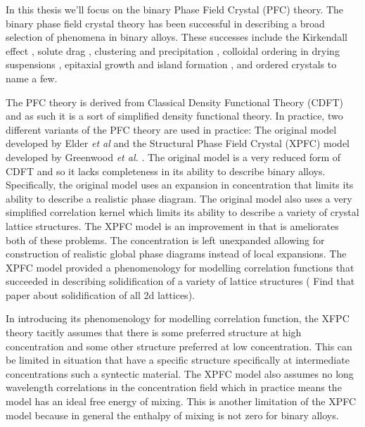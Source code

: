 In this thesis we'll focus on the binary Phase Field Crystal (PFC) theory. The 
binary phase field crystal theory has been successful in describing a broad
selection of phenomena in binary alloys. These successes include the Kirkendall
effect \cite{ELDER11_KIRKENDALL, LU15}, solute drag \cite{GREENWOOD12}, 
clustering and precipitation \cite{FALLAH12, FALLAH13, FALLAH13_AlCu_experiment},
colloidal ordering in drying suspensions \cite{GANAI13}, epitaxial growth
and island formation \cite{ELDER10_NANOISLAND, LU16}, and ordered crystals
\cite{ALSTER17} to name a few. 

The PFC theory is derived from Classical Density Functional Theory (CDFT) and as
such it is a sort of simplified density functional theory. In practice,
two different variants of the PFC theory are used in practice: The original
model developed by Elder \textit{et al} \cite{ELDER07} and the Structural
Phase Field Crystal (XPFC) model developed by Greenwood \textit{et al.}
\cite{GREENWOOD11_BINARY}. The original model is a very reduced form of
CDFT and so it lacks completeness in its ability to describe binary alloys.
Specifically, the original model uses an expansion in concentration that limits 
its ability to describe a realistic phase diagram. The original model also
uses a very simplified correlation kernel which limits its ability to describe
a variety of crystal lattice structures. The XPFC model is an improvement 
in that is ameliorates both of these problems. The concentration is left 
unexpanded allowing for construction of realistic global phase diagrams instead
of local expansions. The XPFC model provided a phenomenology for modelling
correlation functions that succeeded in describing solidification of a
variety of lattice structures ({\color{ForestGreen} Find that paper about
solidification of all 2d lattices}). 


In introducing its phenomenology for modelling correlation function, the 
XFPC theory tacitly assumes that there is some preferred structure at high
concentration and some other structure preferred at low concentration. This
can be limited in situation that have a specific structure specifically at intermediate
concentrations such a syntectic material. The XPFC model also assumes no
long wavelength correlations in the concentration field which in practice means
the model has an ideal free energy of mixing. This is another limitation of 
the XPFC model because in general the enthalpy of mixing is not zero for 
binary alloys.

